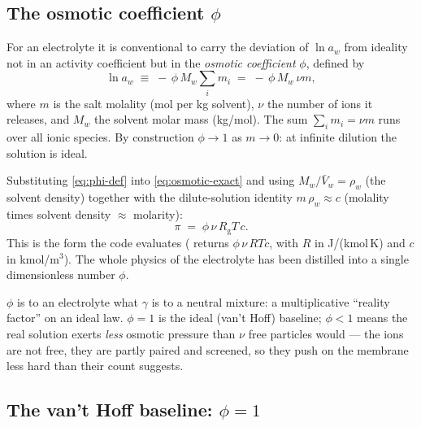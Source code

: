 \documentclass[11pt,a4paper]{article}
\newcommand{\Rgas}{R_{\!\mathrm{g}}}                %
\begin{document}
\subsection{The osmotic coefficient \texorpdfstring{$\phi$}{phi}}

For an electrolyte it is conventional to carry the deviation of
$\ln a_w$ from ideality not in an activity coefficient but in the
\emph{osmotic coefficient} $\phi$, defined by
\begin{equation}
   \ln a_w \;\equiv\; -\,\phi\, M_w \sum_i m_i
            \;=\; -\,\phi\, M_w\, \nu m,
   \label{eq:phi-def}
\end{equation}
where $m$ is the salt molality (mol per kg solvent), $\nu$ the number
of ions it releases, and $M_w$ the solvent molar mass (kg/mol).  The
sum $\sum_i m_i = \nu m$ runs over all ionic species.  By construction
$\phi \to 1$ as $m \to 0$: at infinite dilution the solution is ideal.

Substituting \eqref{eq:phi-def} into \eqref{eq:osmotic-exact} and using
$M_w/\bar V_w = \rho_w$ (the solvent density) together with the
dilute-solution identity $m\,\rho_w \approx c$ (molality times solvent
density $\approx$ molarity):
\begin{equation}
   \boxed{\;
   \pi \;=\; \phi\,\nu\,\Rgas T\, c.
   \;}
   \label{eq:osmotic-phi}
\end{equation}
This is the form the code evaluates (
returns $\phi\,\nu\,R T c$, with $R$ in J/(kmol\,K) and $c$ in
kmol/m$^3$).  The whole physics of the electrolyte has been distilled
into a single dimensionless number $\phi$.

\begin{intuition}
$\phi$ is to an electrolyte what $\gamma$ is to a neutral mixture: a
multiplicative ``reality factor'' on an ideal law.  $\phi = 1$ is the
ideal (van't Hoff) baseline; $\phi < 1$ means the real solution exerts
\emph{less} osmotic pressure than $\nu$ free particles would --- the
ions are not free, they are partly paired and screened, so they push
on the membrane less hard than their count suggests.
\end{intuition}

\subsection{The van't Hoff baseline: \texorpdfstring{$\phi = 1$}{phi=1}}
\end{document}
